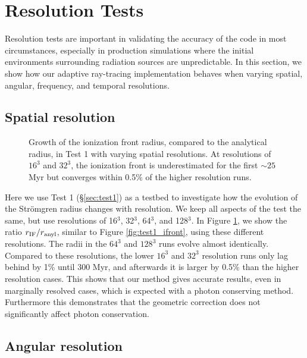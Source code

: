 \documentclass[useAMS,usenatbib]{mn2e}
\begin{document}
\section{Resolution Tests}

Resolution tests are important in validating the accuracy of the code
in most circumstances, especially in production simulations where the
initial environments surrounding radiation sources are unpredictable.
In this section, we show how our adaptive ray-tracing implementation
behaves when varying spatial, angular, frequency, and temporal
resolutions.

\subsection{Spatial resolution}
\label{sec:dx_dep}

\begin{figure}
  \caption{\label{fig:dx_dep1} Growth of the ionization front radius,
    compared to the analytical radius, in Test 1 with varying spatial
    resolutions.  At resolutions of $16^3$ and $32^3$, the ionization
    front is underestimated for the first $\sim25$ Myr but converges
    within 0.5\% of the higher resolution runs.}
\end{figure}

Here we use Test 1 (\S\ref{sec:test1}) as a testbed to investigate how
the evolution of the Str\"{o}mgren radius changes with resolution.  We
keep all aspects of the test the same, but use resolutions of 16$^3$,
32$^3$, 64$^3$, and 128$^3$.  In Figure \ref{fig:dx_dep1}, we show the
ratio $r_{\rm IF}/r_{\rm anyl}$, similar to Figure
\ref{fig:test1_ifront}, using these different resolutions.  The radii
in the $64^3$ and $128^3$ runs evolve almost identically.  Compared to
these resolutions, the lower $16^3$ and $32^3$ resolution runs only
lag behind by 1\% until 300 Myr, and afterwards it is larger by 0.5\%
than the higher resolution cases.  This shows that our method gives
accurate results, even in marginally resolved cases, which is expected
with a photon conserving method.  Furthermore this demonstrates that
the geometric correction does not significantly affect photon
conservation.

\subsection{Angular resolution}
\label{sec:ang_dep}
\end{document}
